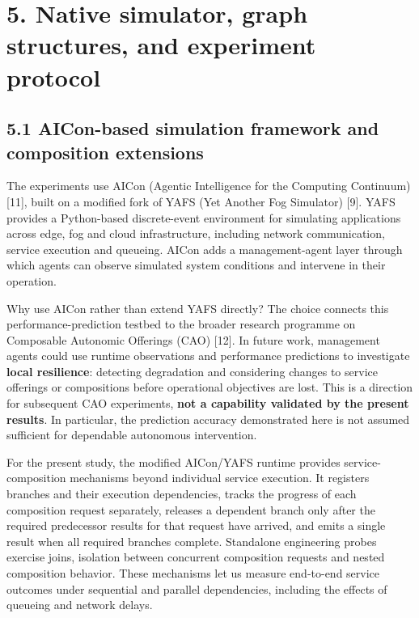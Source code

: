 \documentclass[10pt,a4paper]{article}
\begin{document}
\section*{5. Native simulator, graph structures, and experiment protocol}

\subsection*{5.1 AICon-based simulation framework and composition extensions}

The experiments use AICon (Agentic Intelligence for the Computing Continuum) [11], built on a modified fork of YAFS (Yet Another Fog Simulator) [9]. YAFS provides a Python-based discrete-event environment for simulating applications across edge, fog and cloud infrastructure, including network communication, service execution and queueing. AICon adds a management-agent layer through which agents can observe simulated system conditions and intervene in their operation.

Why use AICon rather than extend YAFS directly? The choice connects this performance-prediction testbed to the broader research programme on Composable Autonomic Offerings (CAO) [12]. In future work, management agents could use runtime observations and performance predictions to investigate \textbf{local resilience}: detecting degradation and considering changes to service offerings or compositions before operational objectives are lost. This is a direction for subsequent CAO experiments, \textbf{not a capability validated by the present results}. In particular, the prediction accuracy demonstrated here is not assumed sufficient for dependable autonomous intervention.

For the present study, the modified AICon/YAFS runtime provides service-composition mechanisms beyond individual service execution. It registers branches and their execution dependencies, tracks the progress of each composition request separately, releases a dependent branch only after the required predecessor results for that request have arrived, and emits a single result when all required branches complete. Standalone engineering probes exercise joins, isolation between concurrent composition requests and nested composition behavior. These mechanisms let us measure end-to-end service outcomes under sequential and parallel dependencies, including the effects of queueing and network delays.
\end{document}

